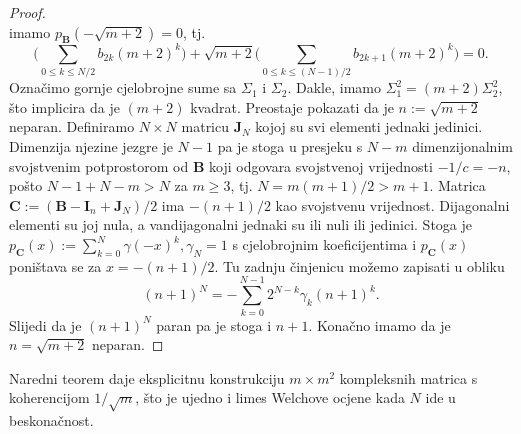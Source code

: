 \documentclass[a4paper,twoside,12pt]{memoir} %
\newcommand{\vect}[1]{\mathbf{#1}}
\renewcommand{\vec}{\vect}
\begin{document}
\begin{proof}
\begin{equation*}
    \end{equation*}
    imamo $p_{\vec B}(-\sqrt{m+2}) = 0$, tj.
    \begin{equation*}
        \bigg( \sum_{0 \leq k \leq N/2}b_{2k} (m+2)^k \bigg) + \sqrt{m+2} \bigg( \sum_{0 \leq k \leq (N-1)/2} b_{2k+1}(m+2)^k\bigg)  = 0.
    \end{equation*}
    Ozna\v{c}imo gornje cjelobrojne sume sa $\Sigma_1$ i $\Sigma_2$. Dakle, imamo $\Sigma_1^2 = (m+2) \Sigma_2^2$, \v{s}to implicira da je $(m+2)$ kvadrat. Preostaje pokazati da je $n := \sqrt{m+2}$ neparan. Definiramo $N \times N$ matricu $\vec J_N$ kojoj su svi elementi jednaki jedinici. Dimenzija njezine jezgre je $N-1$ pa je stoga u presjeku s $N-m$ dimenzijonalnim svojstvenim potprostorom od $\vec B$ koji odgovara svojstvenoj vrijednosti $-1/c = -n$, po\v{s}to $N-1 + N - m > N$ za $m \geq 3$, tj. $N = m(m+1)/2 > m + 1$. Matrica $\vec C := (\vec B - \vec I_n + \vec J_N)/2$ ima $-(n+1)/2$ kao svojstvenu vrijednost. Dijagonalni elementi su joj nula, a vandijagonalni jednaki su ili nuli ili jedinici. Stoga je $p_{\vec C}(x) := \sum_{k=0}^{N} \gamma (-x)^k, \gamma_N = 1$ s cjelobrojnim koeficijentima i $p_{\vec C}(x)$ poni\v{s}tava se za $x = -(n+1)/2$. Tu zadnju \v{c}injenicu mo\v{z}emo zapisati u obliku
    \begin{equation*}
        (n+1)^N = - \sum_{k=0}^{N-1}2^{N-k}\gamma_k(n+1)^k.
    \end{equation*}
    \newpage \noindent Slijedi da je $(n+1)^N$ paran pa je stoga i $n+1$. Kona\v{c}no imamo da je $n=\sqrt{m+2}$ neparan.
\end{proof}
Naredni teorem daje eksplicitnu konstrukciju $m \times m^2$ kompleksnih matrica s koherencijom $1/\sqrt{m}$, \v{s}to je ujedno i limes Welchove ocjene kada $N$ ide u beskona\v{c}nost.
\end{document}
